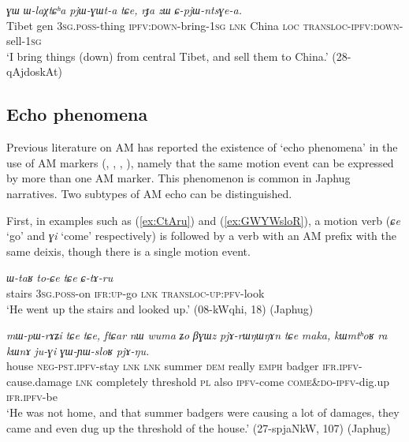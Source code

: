 \documentclass[oneside,a4paper,11pt]{article}
\newcommand{\ipa}[1]{{\phon\textit{#1}}}
\newcommand{\japhug}[2]{\textit{\phon#1} `#2'}
\newcommand{\rouge}[1]{{\color{red}#1}}
\begin{document}
\begin{exe}
\ex \label{ex:pjWGWta}
\gll \ipa{pot} 	\ipa{ɣɯ} 	\ipa{ɯ-laχtɕʰa} 	\ipa{pjɯ-ɣɯt-a} 	\ipa{tɕe,} 	\ipa{rɟa} 	\ipa{zɯ} 	\ipa{ɕ-pjɯ-ntsɣe-a.}  \\
Tibet gen \textsc{3sg}.\textsc{poss}-thing  \textsc{ipfv}:\textsc{down}-bring-\textsc{1sg} \textsc{lnk} China \textsc{loc} \textsc{transloc}-\textsc{ipfv}:\textsc{down}-sell-\textsc{1sg} \\
\glt `I bring things (down) from central Tibet, and sell them to China.' (28-qAjdoskAt)
\end{exe}


\subsection{Echo phenomena} \label{sec:AM.echo}
Previous literature on AM has reported the existence of `echo phenomena' in the use of AM markers (\citealt[251]{wilkins91associated.motion}, \citealt[681-683]{vuillermet12eseejja}, \citealt[128-130]{rose15am}, \citealt[11]{guillaume16am}), namely that the same motion event can be expressed by more than one AM marker. This phenomenon is common in Japhug narratives. Two subtypes of AM echo can be distinguished.

First, in examples such as (\ref{ex:CtAru}) and (\ref{ex:GWYWsloR}), a motion verb (\japhug{ɕe}{go} and \japhug{ɣi}{come} respectively) is followed by a verb with an AM prefix with the same deixis, though there is a single motion event.

\begin{exe}
\ex \label{ex:CtAru}
\gll \ipa{tɕʰi}	\ipa{ɯ-taʁ}	\ipa{to-ɕe}	\ipa{tɕe}	\ipa{\rouge{ɕ}-tɤ-ru}   \\
stairs \textsc{3sg}.\textsc{poss}-on \textsc{ifr}:\textsc{up}-go \textsc{lnk}  \rouge{\textsc{transloc}}-\textsc{up}:\textsc{pfv}-look \\
\glt `He went up the stairs and looked up.'  (08-kWqhi, 18) (Japhug)
\end{exe}

\begin{exe}
\ex \label{ex:GWYWsloR}
\gll \ipa{kʰa}	\ipa{mɯ-pɯ-rɤʑi}	\ipa{tɕe}	\ipa{tɕe,}	\ipa{ftɕar}	\ipa{nɯ}	\ipa{wuma}	\ipa{ʑo}	\ipa{βɣɯz}	\ipa{pjɤ-rɯŋɯŋɤn}	\ipa{tɕe}	\ipa{maka,}	\ipa{kɯmtʰoʁ}	\ipa{ra}	\ipa{kɯnɤ}	\ipa{ju-ɣi}	\ipa{\rouge{ɣɯ}-ɲɯ-sloʁ}	\ipa{pjɤ-ŋu.} \\
house \textsc{neg}-\textsc{pst}.\textsc{ipfv}-stay \textsc{lnk} \textsc{lnk} summer \textsc{dem} really \textsc{emph} badger \textsc{ifr}.\textsc{ipfv}-cause.damage \textsc{lnk} completely threshold \textsc{pl} also \textsc{ipfv}-come \rouge{\textsc{come\&do}}-\textsc{ipfv}-dig.up \textsc{ifr}.\textsc{ipfv}-be \\
\glt `He was not home, and that summer badgers were causing a lot of damages, they came and even dug up  the threshold of the house.'  (27-spjaNkW, 107) (Japhug)
\end{exe}
\end{document}
